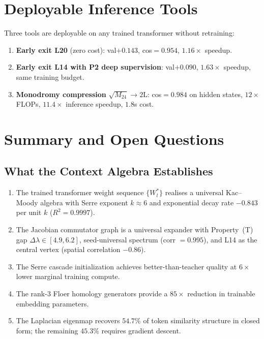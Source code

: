 \documentclass[11pt,a4paper]{article}
\begin{document}
\section{Deployable Inference Tools}
\label{sec:inference}

Three tools are deployable on any trained transformer without retraining:

\begin{enumerate}
  \item \textbf{Early exit L20} (zero cost): val${+}0.143$, cos${=}0.954$,
        $1.16{\times}$ speedup.
  \item \textbf{Early exit L14 with P2 deep supervision}: val${+}0.090$,
        $1.63{\times}$ speedup, same training budget.
  \item \textbf{Monodromy compression} $\sqrt{M_{24}} \to \text{2L}$:
        cos${=}0.984$ on hidden states, $12{\times}$ FLOPs,
        $11.4{\times}$ inference speedup, $1.8$s cost.
\end{enumerate}

\section{Summary and Open Questions}
\label{sec:summary}

\subsection{What the Context Algebra Establishes}

\begin{enumerate}
  \item The trained transformer weight sequence $\{W^*_l\}$ realises a
        universal Kac--Moody algebra with Serre exponent $k{\approx}6$
        and exponential decay rate $-0.843$ per unit $k$ ($R^2{=}0.9997$).
  \item The Jacobian commutator graph is a universal expander with
        Property~(T) gap $\Delta\lambda \in [4.9, 6.2]$, seed-universal
        spectrum (corr $= 0.995$), and L14 as the central vertex
        (spatial correlation $-0.86$).
  \item The Serre cascade initialization achieves better-than-teacher quality
        at $6{\times}$ lower marginal training compute.
  \item The rank-3 Floer homology generators provide a $85{\times}$ reduction
        in trainable embedding parameters.
  \item The Laplacian eigenmap recovers $54.7\%$ of token similarity structure
        in closed form; the remaining $45.3\%$ requires gradient descent.
\end{enumerate}
\end{document}
